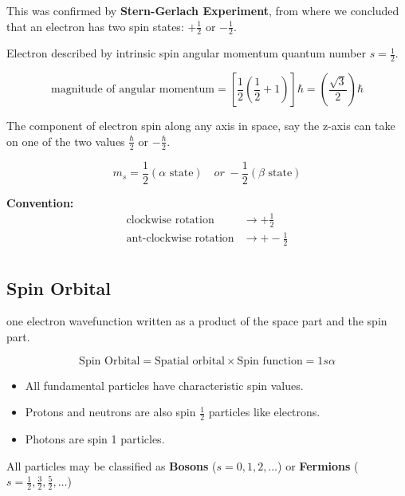 \documentclass[12pt]{article}
\theoremstyle{definition}
\begin{document}
This was confirmed by \textbf{Stern-Gerlach Experiment}, from where we concluded that an electron has two spin states: $+\frac{1}{2}$ or $-\frac{1}{2}$.  

Electron described by intrinsic spin angular momentum quantum number $s = \frac{1}{2}$.

\begin{equation*}
	\textrm{magnitude of angular momentum} = \left[ \frac{1}{2} \left( \frac{1}{2} + 1 \right) \right] \hbar = \left( \frac{\sqrt{3}}{2}  \right) \hbar
\end{equation*}

The component of electron spin along any axis in space, say the z-axis can take on one of the two values $\frac{\hbar}{2}$ or $-\frac{\hbar}{2}$.

\begin{equation*}
	m_s = \frac{1}{2} ( \textrm{$\alpha$ state} )\quad or \; -\frac{1}{2} ( \textrm{$\beta$ state} ) 
\end{equation*}

\textbf{Convention:} 
\begin{align*}
	\textrm{clockwise rotation} &\rightarrow + \frac{1}{2} \\
	\textrm{ant-clockwise rotation} &\rightarrow + -\frac{1}{2} \\
\end{align*}

\subsection{Spin Orbital}
one electron wavefunction written as a product of the space part and the spin part.

\begin{equation*}
	\textrm{Spin Orbital} = \textrm{Spatial orbital} \times \textrm{Spin function} = 1 s \alpha
\end{equation*}

\begin{itemize}
	\item All fundamental particles have characteristic spin values.
	\item Protons and neutrons are also spin $\frac{1}{2}$ particles like electrons.
	\item Photons are spin 1 particles.
\end{itemize}

All particles may be classified as \textbf{Bosons} ($s = 0, 1, 2, \dots$) or \textbf{Fermions} ($s = \frac{1}{2}, \frac{3}{2}, \frac{5}{2}, \dots$) 
\end{document}
